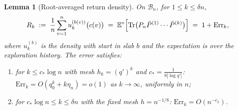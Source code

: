 \documentclass[11pt]{article}
\newcommand{\E}{\mathbb{E}}
\newcommand{\1}{\mathbf{1}}
\newcommand{\Tr}{\mathrm{Tr}}
\newcommand{\Err}{\mathrm{Err}}
\newcommand{\cB}{\mathcal{B}}
\newtheorem{lemma}[theorem]{Lemma}
\theoremstyle{remark}
\begin{document}
\begin{lemma}[Root-averaged return density]\label{lem:root-avg}
On $\cB_n$, for $1\le k\le\delta n$,
\begin{equation}\label{eq:root-avg}
R_k\;:=\;\frac1n\sum_{v=1}^n u_k^{(b(v))}\bigl(c(v)\bigr)
\;=\;\E^\circ\Bigl[\Tr\bigl(P_n\tilde P^{(1)}\cdots\tilde P^{(k)}\bigr)\Bigr]
\;=\;1+\Err_k,
\end{equation}
where $u_k^{(b)}$ is the density with start in slab $b$ and the expectation
is over the exploration history. The error satisfies:
\begin{enumerate}[label=(\roman*)]
\item for $k\le c_*\log n$ with mesh $h_k=(q')^k$ and
$c_*=\frac{1}{8|\log q'|}$: $\Err_k=O(q_0^k+k\eta_n)=o(1)$ as
$k\to\infty$, uniformly in $n$;
\item for $c_*\log n\le k\le\delta n$ with the fixed mesh $h=n^{-1/8}$:
$\Err_k=O(n^{-c_2})$.
\end{enumerate}
\end{lemma}
\end{document}
